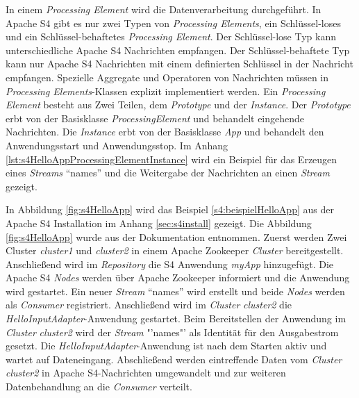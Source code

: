 In einem \textit{Processing Element} wird die Datenverarbeitung durchgeführt. In Apache S4 gibt es nur zwei Typen von \textit{Processing Elements}, ein Schlüssel-loses und ein Schlüssel-behaftetes \textit{Processing Element}. Der Schlüssel-lose Typ kann unterschiedliche Apache S4 Nachrichten empfangen. Der Schlüssel-behaftete Typ kann nur Apache S4 Nachrichten mit einem definierten Schlüssel in der Nachricht empfangen. Spezielle Aggregate und Operatoren von Nachrichten müssen in \textit{Processing Elements}-Klassen explizit implementiert werden. Ein \textit{Processing Element} besteht aus Zwei Teilen, dem \textit{Prototype} und der \textit{Instance}. Der \textit{Prototype} erbt von der Basisklasse \textit{ProcessingElement} und behandelt eingehende Nachrichten. Die \textit{Instance} erbt von der Basisklasse \textit{App} und behandelt den Anwendungsstart und Anwendungsstop. Im Anhang \ref{lst:s4HelloAppProcessingElementInstance} wird ein Beispiel für das Erzeugen eines \textit{Streams} "`names"' und die Weitergabe der Nachrichten an einen \textit{Stream} gezeigt. 

In Abbildung \ref{fig:s4HelloApp} wird das Beispiel \ref{s4:beispielHelloApp} aus der Apache S4 Installation im Anhang \ref{sec:s4install} gezeigt. Die Abbildung \ref{fig:s4HelloApp} wurde aus der Dokumentation  entnommen. Zuerst werden Zwei Cluster \textit{cluster1} und \textit{cluster2} in einem Apache Zookeeper \textit{Cluster} bereitgestellt. Anschließend wird im \textit{Repository} die S4 Anwendung \textit{myApp} hinzugefügt. Die Apache S4 \textit{Nodes} werden über Apache Zookeeper informiert und die Anwendung wird gestartet. Ein neuer \textit{Stream} "`names"' wird erstellt und beide \textit{Nodes} werden als \textit{Consumer} registriert. Anschließend wird im \textit{Cluster} \textit{cluster2} die \textit{HelloInputAdapter}-Anwendung gestartet. Beim Bereitstellen der Anwendung im \textit{Cluster} \textit{cluster2} wird der \textit{Stream} "'names"' als Identität für den Ausgabestrom gesetzt. Die \textit{HelloInputAdapter}-Anwendung ist nach dem Starten aktiv und wartet auf Dateneingang. Abschließend werden eintreffende Daten vom \textit{Cluster} \textit{cluster2} in Apache S4-Nachrichten umgewandelt und zur weiteren Datenbehandlung an die \textit{Consumer} verteilt.


